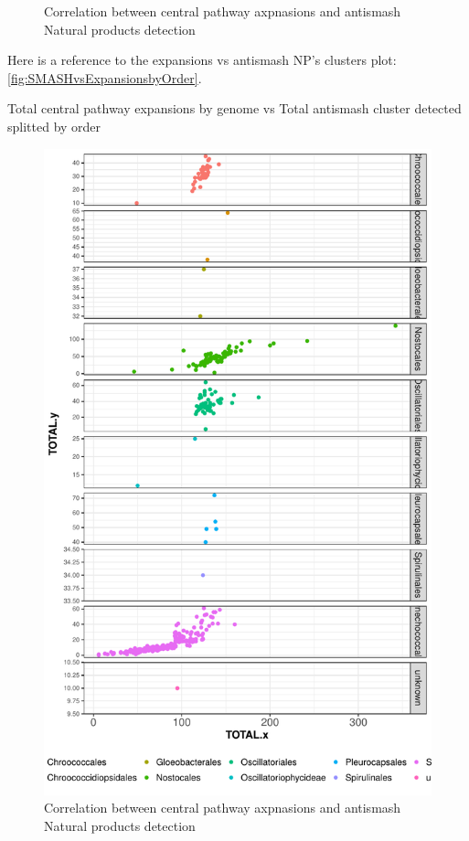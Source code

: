 \documentclass[12pt,twoside]{reedthesis}
\begin{document}
\begin{figure}[h!tbp]
  \caption[Correlation between central pathway axpnasions and antismash Natural products detection]{\normalsize{Correlation between central pathway axpnasions and antismash Natural products detection}}
  \label{fig:SMASHvsExpansionsbyOrder}
  \end{figure}
  
  Here is a reference to the expansions vs antismash NP's clusters plot:
  \autoref{fig:SMASHvsExpansionsbyOrder}. \clearpage 
  
  Total central pathway expansions by genome vs Total antismash cluster
  detected splitted by order
  
  \begin{figure}[h!tbp]
  \centering
  \includegraphics[angle = 0,scale = 0.5]{chapter5/SMASHvsExpansionsbyOrderGRID.pdf}
  \caption[Correlation between central pathway axpnasions and antismash Natural products detection]{\normalsize{Correlation between central pathway axpnasions and antismash Natural products detection}}
  \label{fig:SMASHvsExpansionsbyOrderGRID}
  \end{figure}
  
\end{document}
